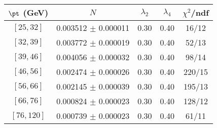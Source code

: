 \begin{tabular}{c||c|c|c|c}
$\pt$ (GeV) & $N$ & $\lambda_{2}$ & $\lambda_4$  & $\chi^2$/ndf  \\
\hline
$[25, 32]$ & 0.003512 $\pm$ 0.000011 & 0.30 & 0.40 & 16/12\\
$[32, 39]$ & 0.003772 $\pm$ 0.000019 & 0.30 & 0.40 & 52/13\\
$[39, 46]$ & 0.004056 $\pm$ 0.000032 & 0.30 & 0.40 & 98/14\\
$[46, 56]$ & 0.002474 $\pm$ 0.000026 & 0.30 & 0.40 & 220/15\\
$[56, 66]$ & 0.002145 $\pm$ 0.000039 & 0.30 & 0.40 & 195/13\\
$[66, 76]$ & 0.000824 $\pm$ 0.000023 & 0.30 & 0.40 & 128/12\\
$[76, 120]$ & 0.000739 $\pm$ 0.000023 & 0.30 & 0.40 & 61/11\\
\end{tabular}
